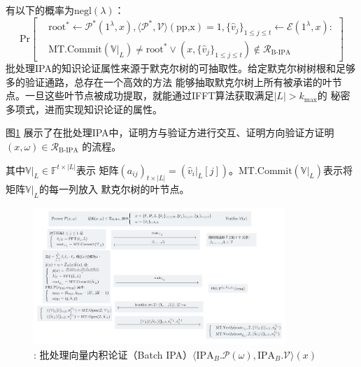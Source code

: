 \documentclass[zihao=-4]{ctexart}
\begin{document}
\begin{itemize}
\begin{equation}
        \end{equation}\par
        有以下的概率为$\text{negl}(\lambda)$：
        \begin{equation}
          \text{Pr}\left[\begin{matrix}&\text{root}^*\leftarrow\mathcal{P}^*(1^{\lambda},x),\langle\mathcal{P}^*,\mathcal{V}\rangle(\text{pp,x})=1,\{\hat{v}_j\}_{1\le j\le t}\leftarrow\mathcal{E}(1^{\lambda},x):\\&\text{MT.Commit}(\mathbb{V}|_L)\neq\text{root}^*\vee(x,\{\hat{v}_j\}_{1\le j\le t})\not\in\mathcal{R}_{\text{B-IPA}}\end{matrix}\right]
        \end{equation}
        批处理IPA的知识论证属性来源于默克尔树的可抽取性。给定默克尔树树根和足够多的验证通路，总存在一个高效的方法
        能够抽取默克尔树上所有被承诺的叶节点。一旦这些叶节点被成功提取，就能通过IFFT算法获取满足$|L|>k_{\max}$的
        秘密多项式，进而实现知识论证的属性\cite{seven}\cite{Fourty-two}。
\end{itemize}\par
图\ref{B-IPA流程} 展示了在批处理IPA中，证明方与验证方进行交互、证明方向验证方证明$(x,\omega)\in\mathcal{R}_{\text{B-IPA}}$
的流程。\par
其中$\mathbb{V}|_L\in\mathbb{F}^{t\times|L|}$表示
矩阵$(a_{ij})_{t\times|L|}=(\hat{v}_i|_L[j])$。$\text{MT.Commit}(\mathbb{V}|_L)$表示将矩阵$\mathbb{V}|_L$的每一列放入
默克尔树的叶节点。
\begin{figure}[H]
  \centering
  \includegraphics[width=0.85\textwidth]{./include_picture/B-IPA.png}
  \caption{: 批处理向量内积论证（Batch IPA）$\langle \text{IPA}_B.\mathcal{P}(\omega),\text{IPA}_B.\mathcal{V}\rangle(x)$}
  \label{B-IPA流程}
\end{figure}
\end{document}
